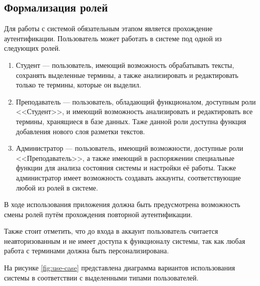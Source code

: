 \subsection{Формализация ролей}

Для работы с системой обязательным этапом является прохождение аутентификации. Пользователь может работать в системе под одной из следующих ролей.

\begin{enumerate}[label*=\arabic*.]
	\item Студент --- пользователь, имеющий возможность обрабатывать тексты, сохранять выделенные термины, а также анализировать и редактировать только те термины, которые он выделил.
	\item Преподаватель --- пользователь, обладающий функционалом, доступным роли <<Студент>>, и имеющий возможность анализировать и редактировать все термины, хранящиеся в базе данных. Таже данной роли доступна функция добавления нового слоя разметки текстов.
	\item Администратор --- пользователь, имеющий возможности, доступные роли <<Преподаватель>>, а также имеющий в распоряжении специальные функции для анализа состояния системы и настройки её работы. Также администратор имеет возможность создавать аккаунты, соответствующие любой из ролей в системе.
	
\end{enumerate}

В ходе использования приложения должна быть предусмотрена возможность смены ролей путём прохождения повторной аутентификации.

Также стоит отметить, что до входа в аккаунт пользователь считается неавторизованным и не имеет доступа к функционалу системы, так как любая работа с терминами должна быть персонализирована.

На рисунке \ref{fig:use-case} представлена диаграмма вариантов использования системы в соответствии с выделенными типами пользователей.

